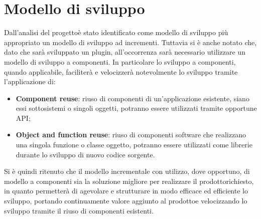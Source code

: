 \section{Modello di sviluppo}
Dall'analisi del progetto\glosp è stato identificato come modello di sviluppo più appropriato un modello di sviluppo ad incrementi. Tuttavia si è anche notato che, dato che sarà sviluppato un plugin, all'occorrenza sarà necessario utilizzare un modello di sviluppo a componenti. In particolare lo sviluppo a componenti, quando applicabile, faciliterà e velocizzerà notevolmente lo sviluppo tramite l'applicazione di:
\begin{itemize}
	\item \textbf{Component reuse}: riuso di componenti di un'applicazione esistente, siano essi sottosistemi o singoli oggetti, potranno essere utilizzati tramite opportune API;
	\item \textbf{Object and function reuse}: riuso di componenti software che realizzano una singola funzione o classe oggetto, potranno essere utilizzati come librerie durante lo sviluppo di nuovo codice sorgente.
\end{itemize}
Si è quindi ritenuto che il modello incrementale con utilizzo, dove opportuno, di modello a componenti sia la soluzione migliore per realizzare il prodotto\glosp richiesto, in quanto permetterà di agevolare e strutturare in modo efficace ed efficiente lo sviluppo, portando continuamente valore aggiunto al prodotto\glosp e velocizzando lo sviluppo tramite il riuso di componenti esistenti.

